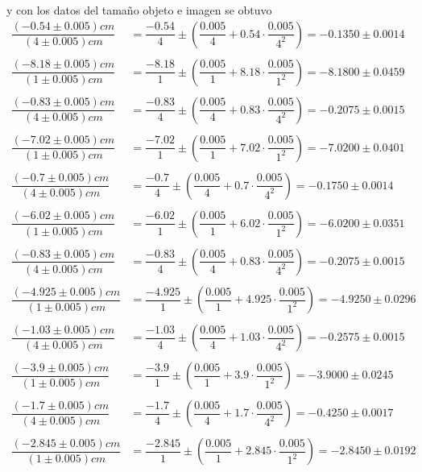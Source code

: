 \documentclass[a4paper, 10pt]{article}
\begin{document}
	y con los datos del tamaño objeto e imagen se obtuvo  
	\begin{align*}
		\dfrac{(-0.54\pm0.005)cm}{(4\pm0.005)cm}&=\dfrac{-0.54}{4}\pm\left(\dfrac{0.005}{4}+0.54\cdot\dfrac{0.005}{4^2}\right)=-0.1350\pm0.0014\\\\
		\dfrac{(-8.18\pm0.005)cm}{(1\pm0.005)cm}&=\dfrac{-8.18}{1}\pm\left(\dfrac{0.005}{1}+8.18\cdot\dfrac{0.005}{1^2}\right)=-8.1800\pm0.0459\\\\
		\dfrac{(-0.83\pm0.005)cm}{(4\pm0.005)cm}&=\dfrac{-0.83}{4}\pm\left(\dfrac{0.005}{4}+0.83\cdot\dfrac{0.005}{4^2}\right)=-0.2075\pm0.0015\\\\
		\dfrac{(-7.02\pm0.005)cm}{(1\pm0.005)cm}&=\dfrac{-7.02}{1}\pm\left(\dfrac{0.005}{1}+7.02\cdot\dfrac{0.005}{1^2}\right)=-7.0200\pm0.0401\\\\
		\dfrac{(-0.7\pm0.005)cm}{(4\pm0.005)cm}&=\dfrac{-0.7}{4}\pm\left(\dfrac{0.005}{4}+0.7\cdot\dfrac{0.005}{4^2}\right)=-0.1750\pm0.0014\\\\
		\dfrac{(-6.02\pm0.005)cm}{(1\pm0.005)cm}&=\dfrac{-6.02}{1}\pm\left(\dfrac{0.005}{1}+6.02\cdot\dfrac{0.005}{1^2}\right)=-6.0200\pm0.0351\\\\
		\dfrac{(-0.83\pm0.005)cm}{(4\pm0.005)cm}&=\dfrac{-0.83}{4}\pm\left(\dfrac{0.005}{4}+0.83\cdot\dfrac{0.005}{4^2}\right)=-0.2075\pm0.0015\\\\
		\dfrac{(-4.925\pm0.005)cm}{(1\pm0.005)cm}&=\dfrac{-4.925}{1}\pm\left(\dfrac{0.005}{1}+4.925\cdot\dfrac{0.005}{1^2}\right)=-4.9250\pm0.0296\\\\
		\dfrac{(-1.03\pm0.005)cm}{(4\pm0.005)cm}&=\dfrac{-1.03}{4}\pm\left(\dfrac{0.005}{4}+1.03\cdot\dfrac{0.005}{4^2}\right)=-0.2575\pm0.0015\\\\
		\dfrac{(-3.9\pm0.005)cm}{(1\pm0.005)cm}&=\dfrac{-3.9}{1}\pm\left(\dfrac{0.005}{1}+3.9\cdot\dfrac{0.005}{1^2}\right)=-3.9000\pm0.0245\\\\
		\dfrac{(-1.7\pm0.005)cm}{(4\pm0.005)cm}&=\dfrac{-1.7}{4}\pm\left(\dfrac{0.005}{4}+1.7\cdot\dfrac{0.005}{4^2}\right)=-0.4250\pm0.0017\\\\
		\dfrac{(-2.845\pm0.005)cm}{(1\pm0.005)cm}&=\dfrac{-2.845}{1}\pm\left(\dfrac{0.005}{1}+2.845\cdot\dfrac{0.005}{1^2}\right)=-2.8450\pm0.0192\\\\
	\end{align*}
	
	
\end{document}
